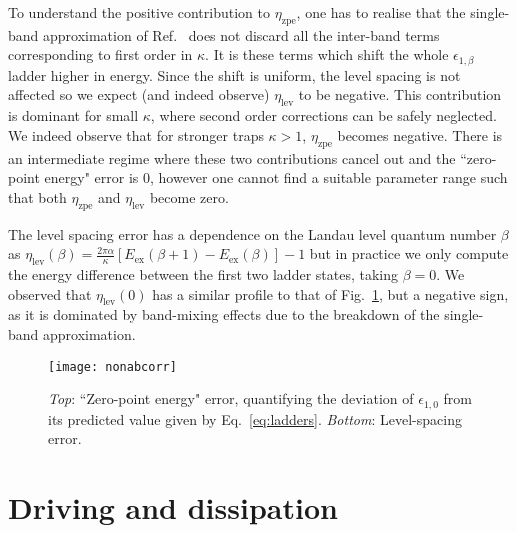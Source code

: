 \documentclass[twocolumn, 10pt, aps, superscriptaddress, floatfix, showpacs, pra, citeautoscript]{revtex4-1}
\newcommand{\co}[2]{#2}
\renewcommand{\paragraph}{\co}
\begin{document}
\paragraph{This contribution is due to inter-band terms.}
To understand the positive contribution to $\eta_{\text{zpe}}$, one
has to realise that the single-band approximation of
Ref.~ does not discard all the
inter-band terms corresponding to first order in $\kappa$. It is these
terms which shift the whole $\epsilon_{1,\beta}$ ladder higher in
energy. Since the shift is uniform, the level spacing is not affected
so we expect (and indeed observe) $\eta_{\text{lev}}$ to be
negative. This contribution is dominant for small $\kappa$, where
second order corrections can be safely neglected. We indeed observe
that for stronger traps $\kappa > 1$, $\eta_{\text{zpe}}$ becomes
negative. There is an intermediate regime where these two
contributions cancel out and the ``zero-point energy" error is 0,
however one cannot find a suitable parameter range such that both
$\eta_{\text{zpe}}$ and $\eta_{\text{lev}}$ become zero.


\paragraph{The level spacing error is dominated by band-mixing effects. }
The level spacing error has a dependence on the Landau level quantum
number $\beta$ as
$\eta_{\text{lev}}(\beta) = \frac{2\pi \alpha}{\kappa} [E_{\text{ex}}(\beta+1) -
E_{\text{ex}}(\beta)] -1$
but in practice we only compute the energy difference between the
first two ladder states, taking $\beta = 0$. We observed that
$\eta_{\text{lev}}(0)$ has a similar profile to that of
Fig.~\ref{fig:zpe}, but a negative sign, as it is dominated by
band-mixing effects due to the breakdown of the single-band
approximation.


\begin{figure}[htb]\centering
  \texttt{[image: nonabcorr]} %
  \caption{\emph{Top}: ``Zero-point energy" error, quantifying the deviation of
    $\epsilon_{1,0}$ from its predicted value given by Eq.~\eqref{eq:ladders}.
    \emph{Bottom}: Level-spacing error.}
  \label{fig:zpe}
\end{figure}



\section{Driving and dissipation}\label{sec:driven-dissipation}
\end{document}
